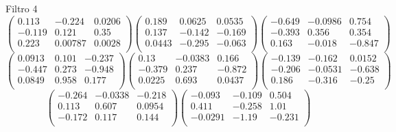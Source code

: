 Filtro 4
{ \small
\[
\begin{pmatrix}
  0.113 & -0.224 & 0.0206 \\
  -0.119 & 0.121 & 0.35 \\
  0.223 & 0.00787 & 0.0028 \\
\end{pmatrix}
\begin{pmatrix}
  0.189 & 0.0625 & 0.0535 \\
  0.137 & -0.142 & -0.169 \\
  0.0443 & -0.295 & -0.063 \\
\end{pmatrix}
\begin{pmatrix}
  -0.649 & -0.0986 & 0.754 \\
  -0.393 & 0.356 & 0.354 \\
  0.163 & -0.018 & -0.847 \\
\end{pmatrix}
\]
\[
\begin{pmatrix}
  0.0913 & 0.101 & -0.237 \\
  -0.447 & 0.273 & -0.948 \\
  0.0849 & 0.958 & 0.177 \\
\end{pmatrix}
\begin{pmatrix}
  0.13 & -0.0383 & 0.166 \\
  -0.379 & 0.237 & -0.872 \\
  0.0225 & 0.693 & 0.0437 \\
\end{pmatrix}
\begin{pmatrix}
  -0.139 & -0.162 & 0.0152 \\
  -0.206 & -0.0531 & -0.638 \\
  0.186 & -0.316 & -0.25 \\
\end{pmatrix}
\]
\[
\begin{pmatrix}
  -0.264 & -0.0338 & -0.218 \\
  0.113 & 0.607 & 0.0954 \\
  -0.172 & 0.117 & 0.144 \\
\end{pmatrix}
\begin{pmatrix}
  -0.093 & -0.109 & 0.504 \\
  0.411 & -0.258 & 1.01 \\
  -0.0291 & -1.19 & -0.231 \\
\end{pmatrix}
\]
}

